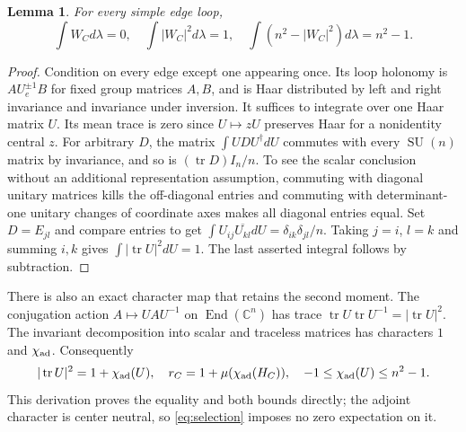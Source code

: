 \documentclass[11pt]{article}
\newtheorem{lemma}[theorem]{Lemma}
\theoremstyle{definition}
\newcommand{\tr}{\operatorname{tr}}
\newcommand{\SU}{\operatorname{SU}}
\begin{document}
\begin{lemma}\label{lem:Haar-loop}
For every simple edge loop,
\[
 \int W_Cd\lambda=0,\quad
 \int|W_C|^2d\lambda=1,\quad
 \int(n^2-|W_C|^2)d\lambda=n^2-1.
\]
\end{lemma}
\begin{proof}
Condition on every edge except one appearing once. Its loop holonomy
is $A U_e^{\pm1}B$ for fixed group matrices $A,B$, and is Haar distributed
by left and right invariance and invariance under inversion. It suffices
to integrate over one Haar matrix $U$. Its mean trace is zero since
$U\mapsto zU$ preserves Haar for a nonidentity central $z$.
For arbitrary $D$, the matrix $\int UDU^\dagger dU$ commutes with every
$\SU(n)$ matrix by invariance, and so is $(\tr D)I_n/n$.
To see the scalar conclusion without an additional representation
assumption, commuting with diagonal unitary matrices kills the
off-diagonal entries and commuting with determinant-one unitary changes
of coordinate axes makes all diagonal entries equal. Set $D=E_{jl}$
and compare entries to get
$\int U_{ij}\overline{U_{kl}}dU=\delta_{ik}\delta_{jl}/n$.
Taking $j=i$, $l=k$ and summing $i,k$ gives $\int|\tr U|^2dU=1$.
The last asserted integral follows by subtraction.
\end{proof}

There is also an exact character map that retains the second moment.
The conjugation action $A\mapsto UAU^{-1}$ on $\operatorname{End}(\mathbb C^n)$
has trace $\tr U\tr U^{-1}=|\tr U|^2$. The invariant decomposition into
scalar and traceless matrices has characters $1$ and $\chi_{\rm ad}$.
Consequently
\begin{equation}\label{eq:adjointmoment}
 |\tr U|^2=1+\chi_{\rm ad}(U),\quad
 r_C=1+\mu(\chi_{\rm ad}(H_C)),\quad
 -1\leq\chi_{\rm ad}(U)\leq n^2-1.
\end{equation}
This derivation proves the equality and both bounds directly; the adjoint
character is center neutral, so \eqref{eq:selection} imposes no zero
expectation on it.
\end{document}
